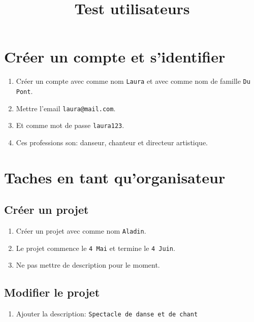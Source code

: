 \documentclass[11pt]{article}
\author{}
\begin{document}
\pagestyle{fancy}
\fancyhead{}


\title{\vspace{-1cm}\huge{Test utilisateurs}\vspace{-1.7cm}}
\date{}
\maketitle
\thispagestyle{fancy}
\section{Créer un compte et s'identifier}
\begin{enumerate}
    \item Créer un compte avec comme nom \texttt{Laura} et avec comme nom de famille \texttt{Du Pont}.
    \item Mettre l'email \texttt{laura@mail.com}.
    \item Et comme mot de passe \texttt{laura123}.
    \item Ces professions son: danseur, chanteur et directeur artistique.
\end{enumerate}
\section{Taches en tant qu'organisateur}
\subsection{Créer un projet}
\begin{enumerate}
    \item Créer un projet avec comme nom \texttt{Aladin}.
    \item Le projet commence le \texttt{4 Mai} et termine le \texttt{4 Juin}.
    \item Ne pas mettre de description pour le moment.
\end{enumerate}
\subsection{Modifier le projet}
\begin{enumerate}
    \item Ajouter la description: \texttt{Spectacle de danse et de chant}
\end{enumerate}
\end{document}
